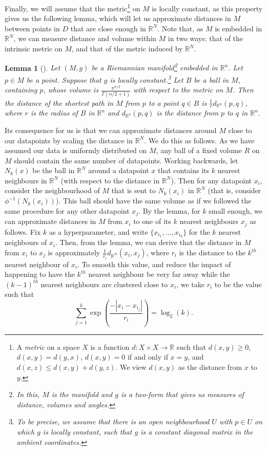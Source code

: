 \documentclass[a4paper,11pt,leqno]{article} \usepackage{amsmath}
\newcommand{\RR}{\mathbb{R}} \newcommand{\QQ}{\mathbb{Q}}
\newtheorem*{lemma}{Lemma} \newtheorem{prop}{Proposition}
\theoremstyle{definition} \newtheorem{defn}{Definition}
\begin{document}
Finally, we will assume that the metric\footnote{ A \textit{metric} on a space
$X$ is a function $d: X\times X\to \RR$ such that $d(x, y) \geq 0$, $d(x, y)
= d(y, x)$, $d(x, y) = 0$ if and only if $x = y$, and $d(x, z) \leq d(x, y)
+ d(y, z)$.  We view $d(x, y)$ as the distance from $x$ to $y$.  } on $M$ is
locally constant, as this property gives us the following lemma, which will let
us approximate distances in $M$ between points in $D$ that are close enough in
$\RR^N$.  Note that, as $M$ is embedded in $\RR^N$, we can measure distance and
volume within $M$ in two ways: that of the intrinsic metric on $M$, and that of
the metric induced by $\RR^N$.

\begin{lemma}[\cite{McInnes18}] Let $(M, g)$ be a Riemannian manifold\footnote{
    In this, $M$ is the manifold and $g$ is a two-form that gives us measures of
    distance, volumes and angles.} embedded in $\RR^n$. Let $p\in M$ be a point.
  Suppose that $g$ is locally constant.\footnote{ To be precise, we assume that
  there is an open neighbourhood $U$ with $p\in U$ on which $g$ is locally
  constant, such that $g$ is a constant diagonal matrix in the ambient
  coordinates.} Let $B$ be a ball in $M$, containing $p$, whose volume is
  $\frac{\pi^{n/2}}{\Gamma(n/2+1)}$ with respect to the metric on $M$.  Then the
  distance of the shortest path in $M$ from $p$ to a point $q\in B$ is
  $\frac{1}{r}d_{\RR^n}(p, q)$, where $r$ is the radius of $B$ in $\RR^n$ and
  $d_{\RR^n}(p, q)$ is the distance from $p$ to $q$ in $\RR^n$.  \end{lemma}

Its consequence for us is that we can approximate distances around $M$ close to
our datapoints by scaling the distance in $\RR^N$.  We do this as follows.  As
we have assumed our data is uniformly distributed on $M$, any ball of a fixed
volume $R$ on $M$ should contain the same number of datapoints.  Working
backwards, let $N_k(x)$ be the ball in $\RR^N$ around a datapoint $x$ that
contains its $k$ nearest neighbours in $\RR^N$ (with respect to the distance in
$\RR^N$).  Then for any datapoint $x_i$, consider the neighbourhood of $M$ that
is sent to $N_k(x_i)$ in $\RR^N$ (that is, consider $\phi^{-1}(N_k(x_i))$).
This ball should have the same volume as if we followed the same procedure for
any other datapoint $x_j$.  By the lemma, for $k$ small enough, we can
approximate distances in $M$ from $x_i$ to one of its $k$ nearest neighbours
$x_j$ as follows.  Fix $k$ as a hyperparameter, and write $\{x_{i_1},\dots,
x_{i_k}\}$ for the $k$ nearest neighbours of $x_i$.  Then, from the lemma, we
can derive that the distance in $M$ from $x_i$ to $x_j$ is approximately
$\frac{1}{r_i}d_{\RR^N}(x_i, x_j)$, where $r_i$ is the distance to the $k^{th}$
nearest neighbour of $x_i$.  To smooth this value, and reduce the impact of
happening to have the $k^{th}$ nearest neighbour be very far away while the
$(k-1)^{th}$ nearest neighbours are clustered close to $x_i$, we take $r_i$ to
be the value such that $$\sum_{j=1}^k\exp\left(\frac{-|x_i-x_{i_j}|}{r_i}\right)
= \log_2(k).$$
\end{document}

